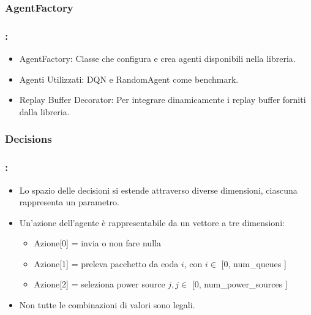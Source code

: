 \documentclass[compress]{beamer}
\begin{document}
\subsubsection{AgentFactory}
\begin{frame}
    \frametitle{\subsecname: \subsubsecname}
    \begin{itemize}
        \item AgentFactory: Classe che configura e crea agenti disponibili nella libreria.
        \item Agenti Utilizzati: DQN e RandomAgent come benchmark.
        \item Replay Buffer Decorator: Per integrare dinamicamente i replay buffer forniti dalla libreria.
    \end{itemize}
\end{frame}

\subsubsection{Decisions}
\begin{frame}
    \frametitle{\subsecname: \subsubsecname}
    \begin{itemize}
        \item Lo spazio delle decisioni si estende attraverso diverse dimensioni, ciascuna rappresenta un parametro.
        \item Un'azione dell'agente è rappresentabile da un vettore a tre dimensioni:
        \begin{itemize}
            \item Azione[0] = invia o non fare nulla
            \item Azione[1] = preleva pacchetto da coda $i$, con $i \in$ [0, num\_queues ]
            \item Azione[2] = seleziona power source $j, j \in$ [0, num\_power\_sources ]
        \end{itemize}
        \item Non tutte le combinazioni di valori sono legali.
    \end{itemize}
\end{frame}
\end{document}
